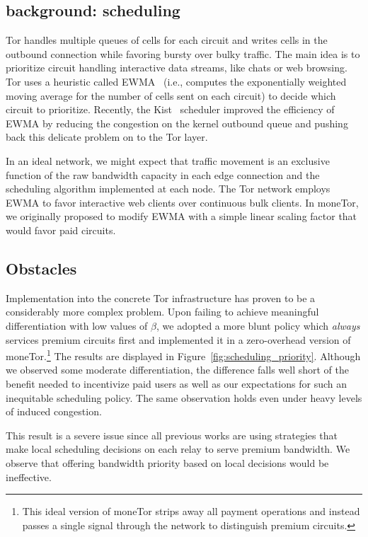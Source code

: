 \subsection{background: scheduling}

Tor handles multiple queues of cells for each circuit and writes cells in the outbound connection while favoring bursty over bulky traffic.
The main idea is to prioritize circuit handling interactive data streams, like chats or web browsing.
Tor uses a heuristic called EWMA~\cite{tang2010improved} (i.e., computes the exponentially weighted moving average for the number of cells sent on each circuit) to decide which circuit to prioritize.
Recently, the Kist~\cite{jansen2014never} scheduler improved the efficiency of EWMA by reducing the congestion on the kernel outbound queue and pushing back this delicate problem on to the Tor layer.

In an ideal network, we might expect that traffic movement is an exclusive function of the raw bandwidth capacity in each edge connection and the scheduling algorithm implemented at each node.
The Tor network employs EWMA to favor interactive web clients over continuous bulk clients.
In moneTor, we originally proposed to modify EWMA with a simple linear scaling factor that would favor paid circuits.

\subsection{Obstacles}

Implementation into the concrete Tor infrastructure has proven to be a considerably more complex problem.
Upon failing to achieve meaningful differentiation with low values of $\beta$, we adopted a more blunt policy which \emph{always} services premium circuits first and implemented it in a zero-overhead version of moneTor.\footnote{This ideal version of moneTor strips away all payment operations and instead passes a single signal through the network to distinguish premium circuits.}
The results are displayed in Figure~\ref{fig:scheduling_priority}.
Although we observed some moderate differentiation, the difference falls well short of the benefit needed to incentivize paid users as well as our expectations for such an inequitable scheduling policy.
The same observation holds even under heavy levels of induced congestion.

This result is a severe issue since all previous works are using strategies that make local scheduling decisions on each relay to serve premium bandwidth.
We observe that offering bandwidth priority based on local decisions would be ineffective.

